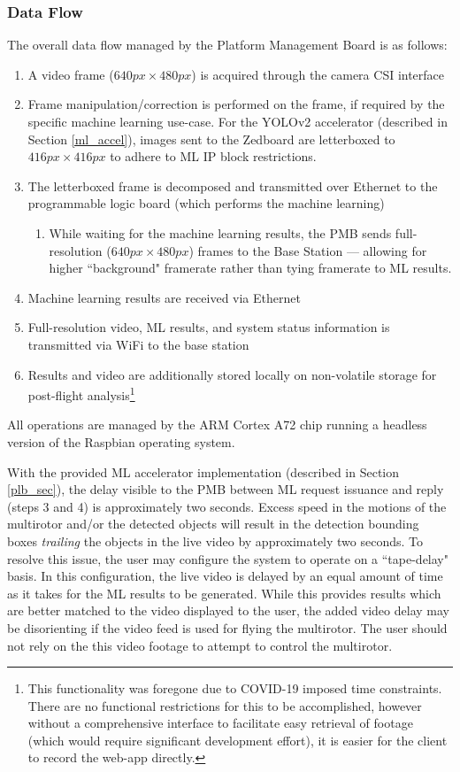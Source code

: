 \subsubsection{Data Flow}
\label{pmb_dataflow}
The overall data flow managed by the Platform Management Board is as follows:
\begin{enumerate}
\item A video frame ($640px \times 480px$) is acquired through the camera CSI interface
\item Frame manipulation/correction is performed on the frame, if required by the specific machine learning use-case. For the YOLOv2 accelerator (described in Section \ref{ml_accel}), images sent to the Zedboard are letterboxed to $416px \times 416px$ to adhere to ML IP block restrictions.
\item The letterboxed frame is decomposed and transmitted over Ethernet to the programmable logic board (which performs the machine learning)
\begin{enumerate}
\item While waiting for the machine learning results, the PMB sends full-resolution ($640px \times 480px$) frames to the Base Station --- allowing for higher ``background" framerate rather than tying framerate to ML results.
\end{enumerate}
\item Machine learning results are received via Ethernet
\item Full-resolution video, ML results, and system status information is transmitted via WiFi to the base station
\item Results and video are additionally stored locally on non-volatile storage for post-flight analysis\footnote{This functionality was foregone due to COVID-19 imposed time constraints. There are no functional restrictions for this to be accomplished, however without a comprehensive interface to facilitate easy retrieval of footage (which would require significant development effort), it is easier for the client to record the web-app directly.}
\end{enumerate}

All operations are managed by the ARM Cortex A72 chip running a headless version of the Raspbian operating system. 

With the provided ML accelerator implementation (described in Section \ref{plb_sec}), the delay visible to the PMB between ML request issuance and reply (steps 3 and 4) is approximately two seconds. Excess speed in the motions of the multirotor and/or the detected objects will result in the detection bounding boxes \textit{trailing} the objects in the live video by approximately two seconds. To resolve this issue, the user may configure the system to operate on a ``tape-delay" basis. In this configuration, the live video is delayed by an equal amount of time as it takes for the ML results to be generated. While this provides results which are better matched to the video displayed to the user, the added video delay may be disorienting if the video feed is used for flying the multirotor. The user should not rely on the this video footage to attempt to control the multirotor.

